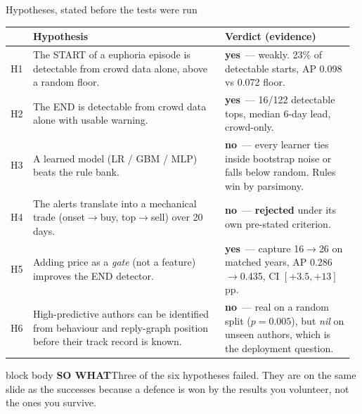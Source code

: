 \documentclass[aspectratio=169,11pt]{beamer}
\newcommand{\sowhatfont}{\footnotesize}
\newcommand{\sowhat}[1]{%
  \vspace{0.3em}
  \begin{beamercolorbox}[wd=\linewidth,sep=0.55em]{block body}
    {\sowhatfont\textbf{\color{gicnavy}SO WHAT}\quad #1}
  \end{beamercolorbox}}
\newcommand{\yes}{{\color{bullish}\textbf{yes}}}
\newcommand{\no}{{\color{bearish}\textbf{no}}}
\begin{document}
\begin{frame}{Hypotheses, stated before the tests were run}
  \scriptsize
  \setlength{\tabcolsep}{2pt}
  \renewcommand{\arraystretch}{0.86}
  {\begin{tabular}{@{}p{0.05\linewidth}p{0.55\linewidth}p{0.37\linewidth}@{}}
      \toprule
      & \textbf{Hypothesis} & \textbf{Verdict (evidence)} \\
      \midrule
      H1 & The START of a euphoria episode is detectable from crowd data
           alone, above a random floor. &
           \yes\ --- weakly. 23\% of detectable starts, AP 0.098 vs 0.072
           floor. \\
      H2 & The END is detectable from crowd data alone with usable warning. &
           \yes\ --- 16/122 detectable tops, median 6-day lead, crowd-only. \\
      H3 & A learned model (LR / GBM / MLP) beats the rule bank. &
           \no\ --- every learner ties inside bootstrap noise or falls below
           random. Rules win by parsimony. \\
      H4 & The alerts translate into a mechanical trade
           (onset$\rightarrow$buy, top$\rightarrow$sell) over 20 days. &
           \no\ --- \textbf{rejected} under its own pre-stated criterion. \\
      H5 & Adding price as a \emph{gate} (not a feature) improves the END
           detector. &
           \yes\ --- capture 16$\rightarrow$26 on matched years, AP
           0.286$\rightarrow$0.435, CI $[+3.5,+13]$pp. \\
      H6 & High-predictive authors can be identified from behaviour and
           reply-graph position before their track record is known. &
           \no\ --- real on a random split ($p=0.005$), but \emph{nil} on
           unseen authors, which is the deployment question. \\
      \bottomrule
    \end{tabular}}
  \vspace{-0.85em}
  \sowhat{Three of the six hypotheses failed. They are on the same slide as the
    successes because a defence is won by the results you volunteer, not the
    ones you survive.}
\end{frame}
\end{document}

